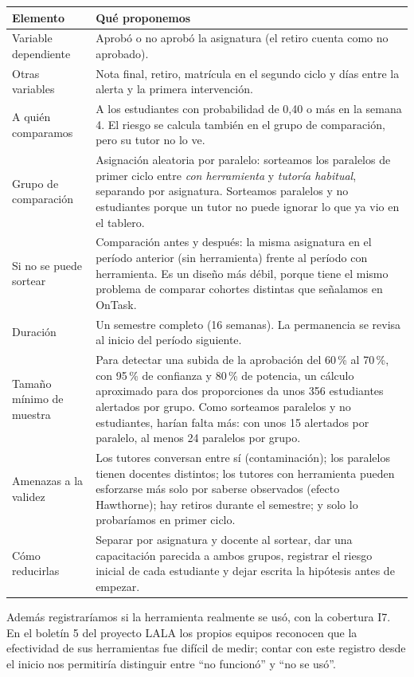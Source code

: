 \documentclass[11pt]{article}
\begin{document}
{\small
\begin{longtable}{P{3.4cm} P{12.0cm}}
\toprule
\textbf{Elemento} & \textbf{Qué proponemos}\\
\midrule
\endhead
\bottomrule
\endfoot
Variable dependiente & Aprobó o no aprobó la asignatura (el retiro cuenta como no aprobado).\\
Otras variables & Nota final, retiro, matrícula en el segundo ciclo y días entre la alerta y la primera intervención.\\
A quién comparamos & A los estudiantes con probabilidad de 0,40 o más en la semana 4. El riesgo se calcula también en el grupo de comparación, pero su tutor no lo ve.\\
Grupo de comparación & Asignación aleatoria por paralelo: sorteamos los paralelos de primer ciclo entre \emph{con herramienta} y \emph{tutoría habitual}, separando por asignatura. Sorteamos paralelos y no estudiantes porque un tutor no puede ignorar lo que ya vio en el tablero.\\
Si no se puede sortear & Comparación antes y después: la misma asignatura en el período anterior (sin herramienta) frente al período con herramienta. Es un diseño más débil, porque tiene el mismo problema de comparar cohortes distintas que señalamos en OnTask.\\
Duración & Un semestre completo (16 semanas). La permanencia se revisa al inicio del período siguiente.\\
Tamaño mínimo de muestra & Para detectar una subida de la aprobación del 60\,\% al 70\,\%, con 95\,\% de confianza y 80\,\% de potencia, un cálculo aproximado para dos proporciones da unos 356 estudiantes alertados por grupo. Como sorteamos paralelos y no estudiantes, harían falta más: con unos 15 alertados por paralelo, al menos 24 paralelos por grupo.\\
Amenazas a la validez & Los tutores conversan entre sí (contaminación); los paralelos tienen docentes distintos; los tutores con herramienta pueden esforzarse más solo por saberse observados (efecto Hawthorne); hay retiros durante el semestre; y solo lo probaríamos en primer ciclo.\\
Cómo reducirlas & Separar por asignatura y docente al sortear, dar una capacitación parecida a ambos grupos, registrar el riesgo inicial de cada estudiante y dejar escrita la hipótesis antes de empezar.\\
\end{longtable}
}

Además registraríamos si la herramienta realmente se usó, con la cobertura I7. En el boletín 5 del proyecto LALA los propios equipos reconocen que la efectividad de sus herramientas fue difícil de medir; contar con este registro desde el inicio nos permitiría distinguir entre ``no funcionó'' y ``no se usó''.
\end{document}
